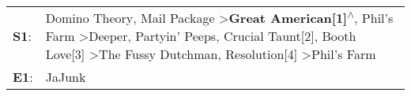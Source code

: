 \begin{supertabular}{p{0.03\textwidth}p{0.92\textwidth}}
 \textbf{S1}:  &  Domino Theory\textsuperscript{}, \enspace Mail Package\textsuperscript{} \textgreater \enspace \textbf{Great American[1]\textsuperscript{$\wedge$}}, \enspace Phil's Farm\textsuperscript{} \textgreater \enspace Deeper\textsuperscript{}, \enspace Partyin' Peeps\textsuperscript{}, \enspace Crucial Taunt[2]\textsuperscript{}, \enspace Booth Love[3]\textsuperscript{} \textgreater \enspace The Fussy Dutchman\textsuperscript{}, \enspace Resolution[4]\textsuperscript{} \textgreater \enspace Phil's Farm\textsuperscript{}  \enspace  \\
 \textbf{E1}:  &                                                                                                                                                                                                                                                                                                                                                                                                                                                                                                               JaJunk\textsuperscript{}  \enspace  \\
\end{supertabular}
